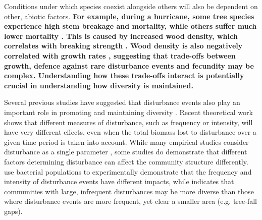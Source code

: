 Conditions under which species coexist alongside others will also be dependent on other, abiotic factors. \textbf{For example, during a hurricane, some tree species experience high stem breakage and mortality, while others suffer much lower mortality \citep{zimmerman1994responses}. This is caused by increased wood density, which correlates with breaking strength \citep{niklas1992plant}. Wood density is also negatively correlated with growth rates \citep{king2005tree}, suggesting that trade-offs between growth, defence against rare disturbance events and fecundity may be complex. Understanding how these trade-offs interact is potentially crucial in understanding how diversity is maintained.}

Several previous studies have suggested that disturbance events also play an important role in promoting and maintaining diversity \citep[e.g.][]{sousa1984role,denslow1987tropical}.  Recent theoretical work \citep[Chapter~1;][]{miller2011frequency,nattrass2012quantifying} shows that different measures of disturbance, such as frequency or intensity, will have very different effects, even when the total biomass lost to disturbance over a given time period is taken into account. While many empirical studies consider disturbance as a single parameter \citep[e.g.][]{molino2001tree,peterson1997tornado,nakagawa2000impact}, some studies do demonstrate that different factors determining disturbance can affect the community structure differently. \cite{hall2012diversity} use bacterial populations to experimentally demonstrate that the frequency and intensity of disturbance events have different impacts, while \cite{denslow1980patterns} indicates that communities with large, infrequent disturbances may be more diverse than those where disturbance events are more frequent, yet clear a smaller area (e.g. tree-fall gaps).

